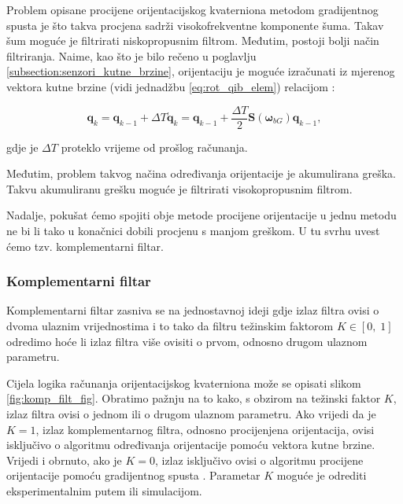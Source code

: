 \documentclass[times, utf8, diplomski, numeric]{templates/template}
\begin{document}
{{{{                Problem opisane procijene orijentacijskog kvaterniona metodom gradijentnog spusta je što takva procjena sadrži visokofrekventne komponente šuma. Takav šum moguće je filtrirati niskopropusnim filtrom. Međutim, postoji bolji način filtriranja. Naime, kao što je bilo rečeno u poglavlju \ref{subsection:senzori_kutne_brzine}, orijentaciju je moguće izračunati iz mjerenog vektora kutne brzine (vidi jednadžbu \ref{eq:rot_qib_elem}) relacijom \cite{uvod_u_svemirske}:

                \begin{equation}
                    \boldsymbol{q}_k = \boldsymbol{q}_{k-1} + \Delta T \dot{\boldsymbol{q}}_k = \boldsymbol{q}_{k-1} + \frac{\Delta T}{2} \boldsymbol{S}(\boldsymbol{\omega}_{bG}) \boldsymbol{q}_{k-1},
                \end{equation}

                gdje je $\Delta T$ proteklo vrijeme od prošlog računanja.

                Međutim, problem takvog načina određivanja orijentacije je akumulirana greška. Takvu akumuliranu grešku moguće je filtrirati visokopropusnim filtrom. 

                Nadalje, pokušat ćemo spojiti obje metode procijene orijentacije u jednu metodu ne bi li tako u konačnici dobili procjenu s manjom greškom. U tu svrhu uvest ćemo tzv. komplementarni filtar.
            }

            \subsubsection{Komplementarni filtar}{
                Komplementarni filtar zasniva se na jednostavnoj ideji gdje izlaz filtra ovisi o dvoma ulaznim vrijednostima i to tako da filtru težinskim faktorom $K \in \left[ 0, \; 1\right]$ odredimo hoće li izlaz filtra više ovisiti o prvom, odnosno drugom ulaznom parametru. 

                Cijela logika računanja orijentacijskog kvaterniona može se opisati slikom \ref{fig:komp_filt_fig}. Obratimo pažnju na to kako, s obzirom na težinski faktor $K$, izlaz filtra ovisi o jednom ili o drugom ulaznom parametru. Ako vrijedi da je $K = 1$, izlaz komplementarnog filtra, odnosno procijenjena orijentacija, ovisi isključivo o algoritmu određivanja orijentacije pomoću vektora kutne brzine. Vrijedi i obrnuto, ako je $K = 0$, izlaz isključivo ovisi o algoritmu procijene orijentacije pomoću gradijentnog spusta \cite{grad_desc}. Parametar $K$ moguće je odrediti eksperimentalnim putem ili simulacijom. 

}}}}
\end{document}
